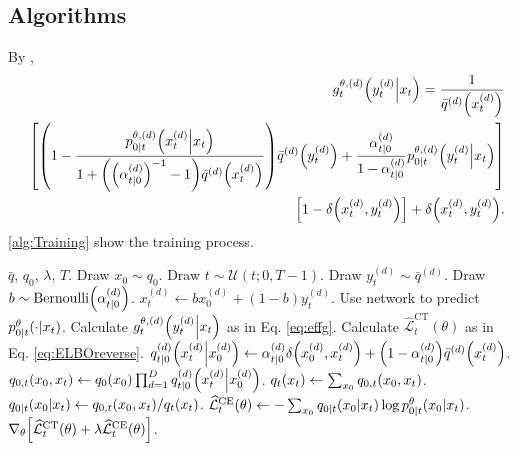 \documentclass{article}
\begin{document}
\subsection{Algorithms}
By \cite{zhao2024unified},
\begin{eqnarray}\label{eq:effg}
  &&g^{\theta,(d)}_t\qty(y^{(d)}_t\middle|x_t) = \frac{1}{\bar{q}^{(d)}\qty(x^{(d)}_t)}\nonumber\\
  &&\qty[\qty(1-\frac{p^{\theta,(d)}_{0|t}\qty(x^{(d)}_t\middle|x_t)}{1+\qty(\qty(\alpha^{(d)}_{t|0})^{-1}-1)\bar{q}^{(d)}\qty(x^{(d)}_t)})\bar{q}^{(d)}\qty(y^{(d)}_t) + \frac{\alpha^{(d)}_{t|0}}{1-\alpha^{(d)}_{t|0}}p^{\theta,(d)}_{0|t}\qty(y^{(d)}_t\middle|x_t)]\nonumber\\
  &&\qty[1 - \delta\qty(x^{(d)}_t, y^{(d)}_t)] + \delta\qty(x^{(d)}_t, y^{(d)}_t).
\end{eqnarray}
\cref{alg:Training} show the training process.
\begin{algorithm}[H]
  \caption{Training}
  \label{alg:Training}
  \begin{algorithmic}
    \Require $\bar{q}$, $q_0$, $\lambda$, $T$.
    \Repeat
    \State Draw $x_0\sim q_0$.
    \State Draw $t\sim\mathcal{U}(t;0,T - 1)$.
    \State Draw $y^{(d)}_t\sim \bar{q}^{(d)}$.
    \State Draw $b\sim \text{Bernoulli}\qty(\alpha^{(d)}_{t|0})$.
    \State $x^{(d)}_t \gets bx^{(d)}_0 + (1-b)y^{(d)}_t$.
    \EndFor
    \State Use network to predict $p^\theta_{0|t}\qty(\cdot\middle|x_t)$.
    \State Calculate $g^{\theta,(d)}_t\qty(y^{(d)}_t\middle|x_t)$ as in Eq. \eqref{eq:effg}.
    \EndFor
    \State Calculate $\widehat{\mathcal{L}}^\text{CT}_t(\theta)$ as in Eq. \eqref{eq:ELBOreverse}.
    \State $q^{(d)}_{t|0}\qty(x^{(d)}_t\middle|x^{(d)}_0) \gets \alpha^{(d)}_{t|0} \delta\qty(x^{(d)}_0, x^{(d)}_t) + \qty(1 - \alpha^{(d)}_{t|0})\bar{q}^{(d)}\qty(x^{(d)}_t)$.
    \EndFor
    \State $q_{0,t}\qty(x_0, x_t) \gets q_0\qty(x_0)\prod_{d=1}^D q^{(d)}_{t|0}\qty(x^{(d)}_t\middle|x^{(d)}_0)$.
    \State $q_t\qty(x_t) \gets \sum_{x_0}q_{0,t}\qty(x_0, x_t)$.
    \State $q_{0|t}\qty(x_0\middle|x_t) \gets q_{0,t}\qty(x_0, x_t) / q_t\qty(x_t)$.
    \EndFor
    \State $\widehat{\mathcal{L}}^\text{CE}_t(\theta)\gets -\sum_{x_0}q_{0|t}\qty(x_0\middle|x_t)\log p^\theta_{0|t}\qty(x_0\middle|x_t)$.
    \State $\nabla_\theta\qty[\widehat{\mathcal{L}}^\text{CT}_t(\theta) + \lambda \widehat{\mathcal{L}}^\text{CE}_t(\theta)]$.
  \end{algorithmic}
\end{algorithm}
\end{document}
